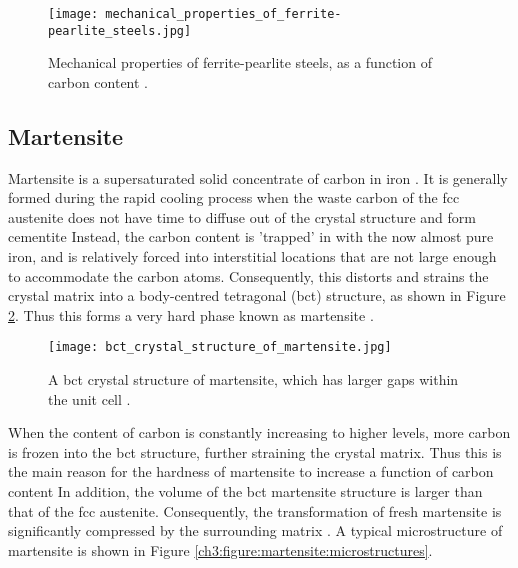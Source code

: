 \begin{figure}[H]
    \centering
    \texttt{[image: mechanical\_properties\_of\_ferrite-pearlite\_steels.jpg]}
    \caption{Mechanical properties of ferrite-pearlite steels, as a function of carbon content \cite{molabe2018determining}. }
    \label{ch3:figure:properties}
\end{figure}

\subsection{Martensite}
Martensite is a supersaturated solid concentrate of carbon in iron \cite{molabe2018determining}. It is generally formed during the rapid cooling process when the waste carbon of the fcc austenite does not have time to diffuse out of the crystal structure and form cementite \cite{bajaj2020steels} Instead, the carbon content is 'trapped' in with the now almost pure iron, and is relatively forced into interstitial locations that are not large enough to accommodate the carbon atoms. Consequently, this distorts and strains the crystal matrix into a body-centred tetragonal (bct) structure, as shown in Figure \ref{ch3:figure:martensite}. Thus this forms a very hard phase known as martensite \cite{molabe2018determining}.
 
\begin{figure}[H]
    \centering
    \texttt{[image: bct\_crystal\_structure\_of\_martensite.jpg]}
    \caption{A bct crystal structure of martensite, which has larger gaps within the unit cell \cite{bajaj2020steels}.}
    \label{ch3:figure:martensite}
\end{figure}

When the content of carbon is constantly increasing to higher levels, more carbon is frozen into the bct structure, further straining the crystal matrix. Thus this is the main reason for the hardness of martensite to increase a function of carbon content \cite{bajaj2020steels} In addition, the volume of the bct martensite structure is larger than that of the fcc austenite. Consequently, the transformation of fresh martensite is significantly compressed by the surrounding matrix \cite{bajaj2020steels}. A typical microstructure of martensite is shown in Figure \ref{ch3:figure:martensite:microstructures}.

